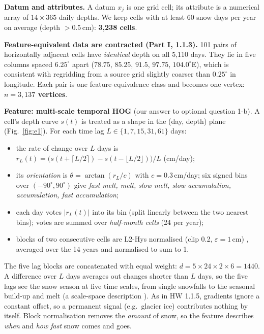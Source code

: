\documentclass[11pt]{article}
\begin{document}
\textbf{Datum and attributes.} A datum $x_j$ is one grid cell; its attribute is a
numerical array of $14\times365$ daily depths. We keep cells with at least 60 snow days
per year on average (depth $>0.5$\,cm): \textbf{3,238 cells}.

\textbf{Feature-equivalent data are contracted (Part I, 1.1.3).} 101 pairs of horizontally
adjacent cells have \emph{identical} depth on all 5,110 days. They lie in five columns
spaced $6.25^\circ$ apart ($78.75$, $85.25$, $91.5$, $97.75$, $104.0^\circ$E), which is
consistent with regridding from a source grid slightly coarser than $0.25^\circ$ in
longitude. Each pair is one feature-equivalence class and becomes one vertex:
\textbf{$n = 3{,}137$ vertices}.

\textbf{Feature: multi-scale temporal HOG} (our answer to optional question 1-b). A cell's
depth curve $s(t)$ is treated as a shape in the (day, depth) plane (Fig.~\ref{fig:e1}).
For each time lag $L \in \{1, 7, 15, 31, 61\}$ days:
\begin{itemize}\setlength\itemsep{0.1em}
  \item the rate of change over $L$ days is
        $r_L(t) = \big(s(t+\lceil L/2\rceil) - s(t-\lfloor L/2\rfloor)\big)/L$ (cm/day);
  \item its \emph{orientation} is $\theta = \arctan(r_L/c)$ with $c = 0.3$\,cm/day; six
        signed bins over $(-90^\circ, 90^\circ)$ give \emph{fast melt, melt, slow melt, slow
        accumulation, accumulation, fast accumulation};
  \item each day votes $|r_L(t)|$ into its bin (split linearly between the two nearest
        bins); votes are summed over \emph{half-month cells} (24 per year);
  \item blocks of two consecutive cells are L2-Hys normalised (clip 0.2,
        $\varepsilon = 1$\,cm) \cite{dalal2005}, averaged over the 14 years and normalised
        to sum to 1.
\end{itemize}
The five lag blocks are concatenated with equal weight:
$d = 5 \times 24 \times 2 \times 6 = 1440$. A difference over $L$ days averages out
changes shorter than $L$ days, so the five lags see the snow season at five time scales,
from single snowfalls to the seasonal build-up and melt (a scale-space description
\cite{lindeberg1994}). As in HW 1.1.5, gradients ignore a constant offset, so a permanent
signal (e.g.\ glacier ice) contributes nothing by itself. Block normalisation removes the
\emph{amount} of snow, so the feature describes \emph{when} and \emph{how fast} snow comes
and goes.
\end{document}
